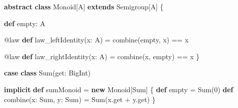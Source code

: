 \documentclass[
  ignorenonframetext,
]{beamer}
\newenvironment{Shaded}{}{}
\newcommand{\DecValTok}[1]{\textcolor[rgb]{0.25,0.63,0.44}{#1}}
\newcommand{\FunctionTok}[1]{\textcolor[rgb]{0.02,0.16,0.49}{#1}}
\newcommand{\KeywordTok}[1]{\textcolor[rgb]{0.00,0.44,0.13}{\textbf{#1}}}
\newcommand{\NormalTok}[1]{#1}
\begin{document}
\begin{frame}[fragile]

\begin{Shaded}
\begin{Highlighting}[]
\KeywordTok{abstract} \KeywordTok{class}\NormalTok{ Monoid[A]}
  \KeywordTok{extends}\NormalTok{ Semigroup[A] \{}

  \KeywordTok{def}\NormalTok{ empty: A}

\NormalTok{  @law }\KeywordTok{def} \FunctionTok{law_leftIdentity}\NormalTok{(x: A) =}
    \FunctionTok{combine}\NormalTok{(empty, x) == x}

\NormalTok{  @law }\KeywordTok{def} \FunctionTok{law_rightIdentity}\NormalTok{(x: A) =}
    \FunctionTok{combine}\NormalTok{(x, empty) == x}
\NormalTok{\}}
\end{Highlighting}
\end{Shaded}

\end{frame}

\begin{frame}[fragile]

\begin{Shaded}
\begin{Highlighting}[]
\KeywordTok{case} \KeywordTok{class} \FunctionTok{Sum}\NormalTok{(get: BigInt)}

\KeywordTok{implicit} \KeywordTok{def}\NormalTok{ sumMonoid = }\KeywordTok{new}\NormalTok{ Monoid[Sum] \{}
  \KeywordTok{def}\NormalTok{ empty = }\FunctionTok{Sum}\NormalTok{(}\DecValTok{0}\NormalTok{)}
  \KeywordTok{def} \FunctionTok{combine}\NormalTok{(x: Sum, y: Sum) = }\FunctionTok{Sum}\NormalTok{(x.}\FunctionTok{get}\NormalTok{ + y.}\FunctionTok{get}\NormalTok{)}
\NormalTok{\}}
\end{Highlighting}
\end{Shaded}

\end{frame}
\end{document}
